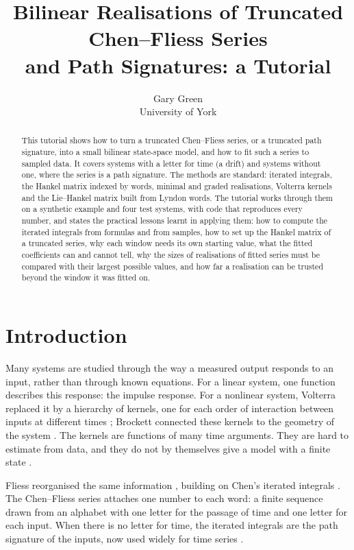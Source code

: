 \documentclass[11pt,a4paper]{article}
\title{Bilinear Realisations of Truncated Chen--Fliess Series\\ and Path Signatures: a Tutorial}
\author{Gary Green\\University of York}
\date{}
\theoremstyle{remark}
\begin{document}
\maketitle

\begin{abstract}
This tutorial shows how to turn a truncated Chen--Fliess series, or a truncated path signature, into a small bilinear state-space model, and how to fit such a series to sampled data.
It covers systems with a letter for time (a drift) and systems without one, where the series is a path signature.
The methods are standard: iterated integrals, the Hankel matrix indexed by words, minimal and graded realisations, Volterra kernels and the Lie--Hankel matrix built from Lyndon words.
The tutorial works through them on a synthetic example and four test systems, with code that reproduces every number, and states the practical lessons learnt in applying them: how to compute the iterated integrals from formulas and from samples, how to set up the Hankel matrix of a truncated series, why each window needs its own starting value, what the fitted coefficients can and cannot tell, why the sizes of realisations of fitted series must be compared with their largest possible values, and how far a realisation can be trusted beyond the window it was fitted on.
\end{abstract}

\section{Introduction}
Many systems are studied through the way a measured output responds to an input, rather than through known equations.
For a linear system, one function describes this response: the impulse response.
For a nonlinear system, Volterra replaced it by a hierarchy of kernels, one for each order of interaction between inputs at different times \cite{Volterra1930}; Brockett connected these kernels to the geometry of the system \cite{Brockett1976}.
The kernels are functions of many time arguments.
They are hard to estimate from data, and they do not by themselves give a model with a finite state \cite{WrayGreen1994}.

Fliess reorganised the same information \cite{Fliess1981}, building on Chen's iterated integrals \cite{Chen1957}.
The Chen--Fliess series attaches one number to each word: a finite sequence drawn from an alphabet with one letter for the passage of time and one letter for each input.
When there is no letter for time, the iterated integrals are the path signature of the inputs, now used widely for time series \cite{Lyons1998,FrizVictoir2010,ChevyrevKormilitzin2016}.
\end{document}
